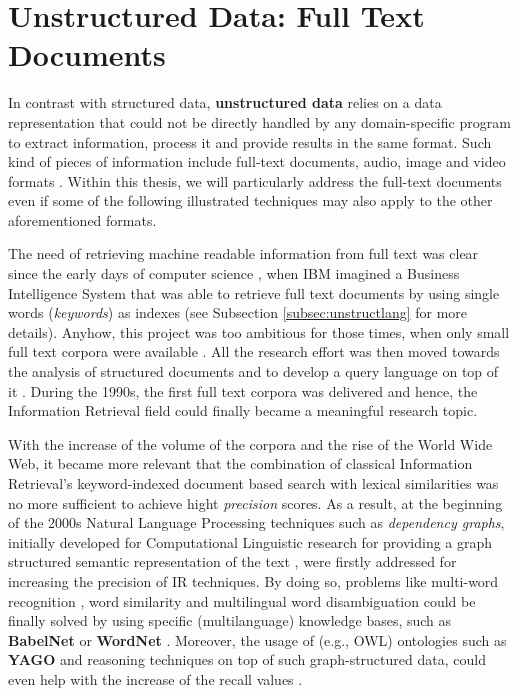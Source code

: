 \section{Unstructured Data: Full Text Documents}\label{sec:unstructured}
In contrast with structured data, \textbf{unstructured data} relies on a data representation that could not be directly handled by any domain-specific program to extract information, process it and provide results in the same format. Such kind of pieces of information include full-text documents, audio, image and video formats \cite{SintSSF09}. Within this thesis, we will particularly address the full-text documents even if some of the following illustrated techniques may also apply to the other aforementioned formats.

The need of retrieving machine readable information from full text was clear since the early days of computer science  \cite{Luhn58}, when IBM imagined a Business Intelligence System that was able to retrieve full text documents by using single words (\textit{keywords}) as indexes (see Subsection \vref{subsec:unstructlang} for more details). Anyhow, this project was too ambitious for those times, when only small full text corpora were available \cite{Singhal01}. All the research effort was then moved towards the analysis of structured documents and to develop a query language on top of it \cite{Codd71a}. During the 1990s, the first full text corpora was delivered \cite{nlacat} and hence, the Information Retrieval field could finally became a meaningful research topic. 

With the increase of the volume of the corpora and the rise of the World Wide Web, it became more relevant that the combination of classical Information Retrieval's  keyword-indexed document based search \cite{Manning} with lexical similarities \cite{KohailBiemann} was no more sufficient to achieve hight \textit{precision} scores. As a result, at the beginning of the 2000s \cite{Brants03} Natural Language Processing techniques such as \textit{dependency graphs}, initially developed for Computational Linguistic research for providing a graph structured semantic representation of the text \cite{Iglesias}, were firstly addressed for increasing the precision of IR techniques. By doing so, problems like multi-word recognition \cite{Lossio-Ventura2014}, word similarity \cite{SemSim} and multilingual word disambiguation \cite{MultiWordSense} could be finally solved by using specific (multilanguage) knowledge bases, such as \textbf{BabelNet} \cite{Navigli12} or \textbf{WordNet} \cite{WordNet}. Moreover, the usage of (e.g., OWL) ontologies such as \textbf{YAGO} \cite{IBMWatson} and reasoning techniques on top of such graph-structured data, could even help with the increase of the recall values \cite{WeltyM06}. 

